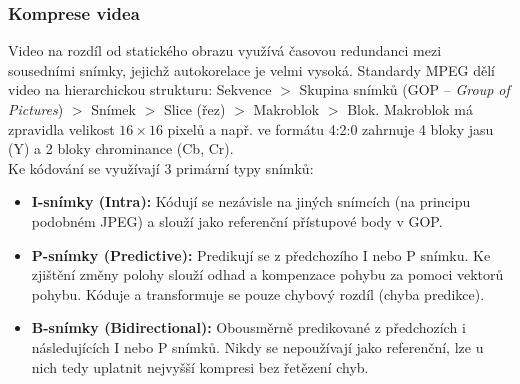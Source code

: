     \subsubsection{Komprese videa}
        Video na rozdíl od statického obrazu využívá časovou redundanci mezi sousedními snímky, jejichž autokorelace je velmi vysoká. Standardy MPEG dělí video na hierarchickou strukturu: Sekvence $>$ Skupina snímků (GOP -- \textit{Group of Pictures}) $>$ Snímek $>$ Slice (řez) $>$ Makroblok $>$ Blok. Makroblok má zpravidla velikost $16 \times 16$ pixelů a např. ve formátu 4:2:0 zahrnuje 4 bloky jasu (Y) a 2 bloky chrominance (Cb, Cr).\\
        Ke kódování se využívají 3 primární typy snímků:
        \begin{itemize}
            \item \textbf{I-snímky (Intra):} Kódují se nezávisle na jiných snímcích (na principu podobném JPEG) a slouží jako referenční přístupové body v GOP.
            \item \textbf{P-snímky (Predictive):} Predikují se z předchozího I nebo P snímku. Ke zjištění změny polohy slouží odhad a kompenzace pohybu za pomoci vektorů pohybu. Kóduje a transformuje se pouze chybový rozdíl (chyba predikce).
            \item \textbf{B-snímky (Bidirectional):} Obousměrně predikované z předchozích i následujících I nebo P snímků. Nikdy se nepoužívají jako referenční, lze u nich tedy uplatnit nejvyšší kompresi bez řetězení chyb.
        \end{itemize}
